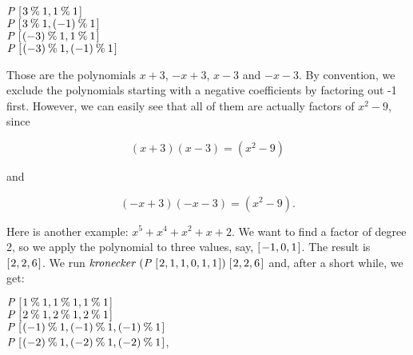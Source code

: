 \documentclass[tikz]{scrreprt}
\newcommand{\Conid}[1]{\mathit{#1}}
\newcommand{\Varid}[1]{\mathit{#1}}
\begin{document}
\ensuremath{\Conid{P}\;[\mskip1.5mu \mathrm{3}\mathbin{\%}\mathrm{1},\mathrm{1}\mathbin{\%}\mathrm{1}\mskip1.5mu]}\\
\ensuremath{\Conid{P}\;[\mskip1.5mu \mathrm{3}\mathbin{\%}\mathrm{1},(\mathbin{-}\mathrm{1})\mathbin{\%}\mathrm{1}\mskip1.5mu]}\\
\ensuremath{\Conid{P}\;[\mskip1.5mu (\mathbin{-}\mathrm{3})\mathbin{\%}\mathrm{1},\mathrm{1}\mathbin{\%}\mathrm{1}\mskip1.5mu]}\\
\ensuremath{\Conid{P}\;[\mskip1.5mu (\mathbin{-}\mathrm{3})\mathbin{\%}\mathrm{1},(\mathbin{-}\mathrm{1})\mathbin{\%}\mathrm{1}\mskip1.5mu]}

Those are the polynomials $x+3$, $-x+3$, $x-3$ and $-x-3$.
By convention, we exclude the polynomials starting with
a negative coefficients by factoring out -1 first.
However, we can easily see that all of them are actually
factors of $x^2 - 9$, since

\begin{equation}
(x+3)(x-3) = (x^2-9)
\end{equation}

and

\begin{equation}
(-x+3)(-x-3) = (x^2-9).
\end{equation}

Here is another example: $x^5 + x^4 + x^2 + x + 2$.
We want to find a factor of degree 2,
so we apply the polynomial to three values, say,
\ensuremath{[\mskip1.5mu \mathbin{-}\mathrm{1},\mathrm{0},\mathrm{1}\mskip1.5mu]}. The result is \ensuremath{[\mskip1.5mu \mathrm{2},\mathrm{2},\mathrm{6}\mskip1.5mu]}.
We run \ensuremath{\Varid{kronecker}\;(\Conid{P}\;[\mskip1.5mu \mathrm{2},\mathrm{1},\mathrm{1},\mathrm{0},\mathrm{1},\mathrm{1}\mskip1.5mu])\;[\mskip1.5mu \mathrm{2},\mathrm{2},\mathrm{6}\mskip1.5mu]} 
and, after a short while, we get:

\ensuremath{\Conid{P}\;[\mskip1.5mu \mathrm{1}\mathbin{\%}\mathrm{1},\mathrm{1}\mathbin{\%}\mathrm{1},\mathrm{1}\mathbin{\%}\mathrm{1}\mskip1.5mu]}\\
\ensuremath{\Conid{P}\;[\mskip1.5mu \mathrm{2}\mathbin{\%}\mathrm{1},\mathrm{2}\mathbin{\%}\mathrm{1},\mathrm{2}\mathbin{\%}\mathrm{1}\mskip1.5mu]}\\
\ensuremath{\Conid{P}\;[\mskip1.5mu (\mathbin{-}\mathrm{1})\mathbin{\%}\mathrm{1},(\mathbin{-}\mathrm{1})\mathbin{\%}\mathrm{1},(\mathbin{-}\mathrm{1})\mathbin{\%}\mathrm{1}\mskip1.5mu]}\\
\ensuremath{\Conid{P}\;[\mskip1.5mu (\mathbin{-}\mathrm{2})\mathbin{\%}\mathrm{1},(\mathbin{-}\mathrm{2})\mathbin{\%}\mathrm{1},(\mathbin{-}\mathrm{2})\mathbin{\%}\mathrm{1}\mskip1.5mu]},
\end{document}
